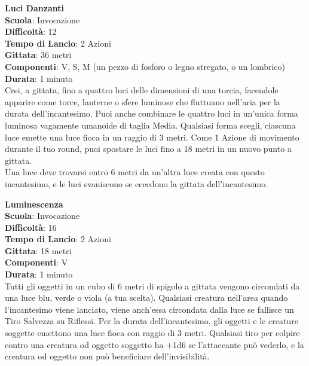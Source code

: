 \begin{multicols}{2}
\medskip\textbf{Luci Danzanti}\\
\textbf{Scuola}: Invocazione\\
\textbf{Difficoltà}: 12\\
\textbf{Tempo di Lancio}: 2 Azioni\\
\textbf{Gittata}: 36 metri\\
\textbf{Componenti}: V, S, M (un pezzo di fosforo o legno stregato, o un lombrico)\\
\textbf{Durata}: 1 minuto\\
Crei, a gittata, fino a quattro luci delle dimensioni di una torcia, facendole apparire come torce, lanterne o sfere luminose che fluttuano nell'aria per la durata dell'incantesimo. Puoi anche combinare le quattro luci in un'unica forma luminosa vagamente umanoide di taglia Media. Qualsiasi forma scegli, ciascuna luce emette una luce fioca in un raggio di 3 metri. Come 1 Azione di movimento durante il tuo round, puoi spostare le luci fino a 18 metri in un nuovo punto a gittata.\\
Una luce deve trovarsi entro 6 metri da un'altra luce creata con questo incantesimo, e le luci svaniscono se eccedono la gittata dell'incantesimo. 

\medskip\textbf{Luminescenza}\\
\textbf{Scuola}: Invocazione\\
\textbf{Difficoltà}: 16\\
\textbf{Tempo di Lancio}: 2 Azioni\\
\textbf{Gittata}: 18 metri\\
\textbf{Componenti}: V\\
\textbf{Durata}: 1 minuto \\
Tutti gli oggetti in un cubo di 6 metri di spigolo a gittata vengono circondati da una luce blu, verde o viola (a tua scelta). Qualsiasi creatura nell'area quando l'incantesimo viene lanciato, viene anch'essa circondata dalla luce se fallisce un Tiro Salvezza su Riflessi. Per la durata dell'incantesimo, gli oggetti e le creature soggette emettono una luce fioca con raggio di 3 metri. Qualsiasi tiro per colpire contro una creatura od oggetto soggetto ha +1d6 se l'attaccante può vederlo, e la creatura od oggetto non può beneficiare dell'invisibilità.


\end{multicols}
